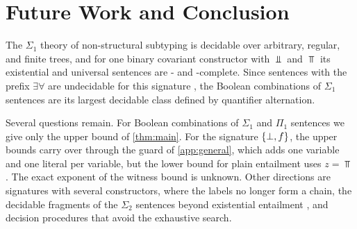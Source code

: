 \section{Future Work and Conclusion}
\label{sec:conclusion}

The $\Sigma_1$ theory of non-structural subtyping is decidable over arbitrary, regular, and
finite trees, and for one binary covariant constructor with $\Bot$ and $\Top$ its existential
and universal sentences are \NExp- and \coNExp-complete. Since sentences with the prefix
$\exists\forall$ are undecidable for this signature \cite{Zhao26S2}, the Boolean
combinations of $\Sigma_1$ sentences are its largest decidable class defined by quantifier
alternation.

Several questions remain. For Boolean combinations of $\Sigma_1$ and $\Pi_1$ sentences we
give only the upper bound of \cref{thm:main}. For the signature $\{\bot,f\}$, the upper bounds
carry over through the guard of \cref{app:general}, which adds one variable and one literal
per variable, but the lower bound for plain entailment uses $z=\Top$ \cite{NSSE26}. The
exact exponent of the witness bound is unknown. Other directions are signatures with several
constructors, where the labels no longer form a chain, the decidable fragments of the
$\Sigma_2$ sentences beyond existential entailment \cite{Zhao26E}, and decision procedures that
avoid the exhaustive search.
